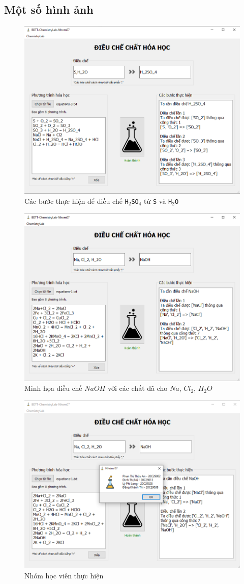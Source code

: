 \documentclass[a4paper]{article}
\begin{document}
	\subsection{Một số hình ảnh}
		\begin{figure}[h]
			\centering
			\includegraphics[width=0.7\linewidth]{images/app-done-2}
			\caption{Các bước thực hiện để điều chế \texttt{H$_2$SO$_4$} từ \texttt{S} và \texttt{H$_2$O}}
			\label{fig:app-done-2}
		\end{figure}
		
		\begin{figure}[h]
			\centering
			\includegraphics[width=0.7\linewidth]{images/app-done}
			\caption{Minh họa điều chế $NaOH$ với các chất đã cho $Na$, $Cl_2$, $H_2O$}
			\label{fig:app-done}
		\end{figure}
		
		\begin{figure}[h]
			\centering
			\includegraphics[width=0.7\linewidth]{images/app-authors}
			\caption{Nhóm học viên thực hiện}
			\label{fig:app-authors}
		\end{figure}
\end{document}
